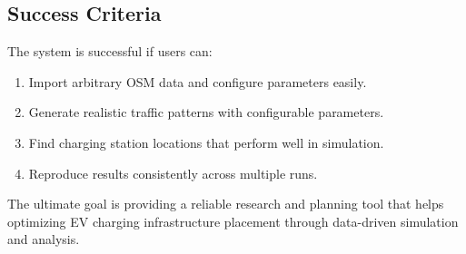 \subsection{Success Criteria}

The system is successful if users can:
\begin{enumerate}
    \item Import arbitrary OSM data and configure parameters easily.
    \item Generate realistic traffic patterns with configurable parameters.
    \item Find charging station locations that perform well in simulation.
    \item Reproduce results consistently across multiple runs.
\end{enumerate}

The ultimate goal is providing a reliable research and planning tool that helps optimizing EV charging infrastructure placement through data-driven simulation and analysis.